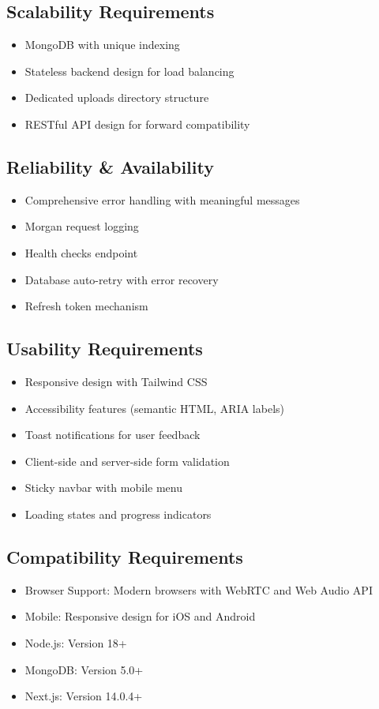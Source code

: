 \documentclass{article}
\begin{document}
\subsection{Scalability Requirements}
\begin{itemize}
    \item MongoDB with unique indexing
    \item Stateless backend design for load balancing
    \item Dedicated uploads directory structure
    \item RESTful API design for forward compatibility
\end{itemize}

\subsection{Reliability \& Availability}
\begin{itemize}
    \item Comprehensive error handling with meaningful messages
    \item Morgan request logging
    \item Health checks endpoint
    \item Database auto-retry with error recovery
    \item Refresh token mechanism
\end{itemize}

\subsection{Usability Requirements}
\begin{itemize}
    \item Responsive design with Tailwind CSS
    \item Accessibility features (semantic HTML, ARIA labels)
    \item Toast notifications for user feedback
    \item Client-side and server-side form validation
    \item Sticky navbar with mobile menu
    \item Loading states and progress indicators
\end{itemize}

\subsection{Compatibility Requirements}
\begin{itemize}
    \item Browser Support: Modern browsers with WebRTC and Web Audio API
    \item Mobile: Responsive design for iOS and Android
    \item Node.js: Version 18+
    \item MongoDB: Version 5.0+
    \item Next.js: Version 14.0.4+
\end{itemize}
\end{document}
